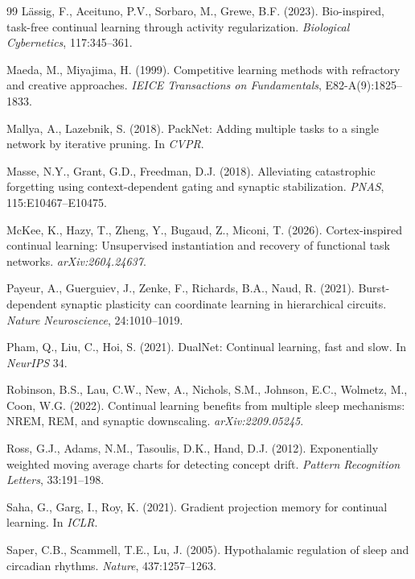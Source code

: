 \documentclass{article}
\begin{document}
\begin{thebibliography}{99}
 L\"assig, F., Aceituno, P.V., Sorbaro, M., Grewe, B.F. (2023). Bio-inspired, task-free continual learning through activity regularization. \emph{Biological Cybernetics}, 117:345--361.

 Maeda, M., Miyajima, H. (1999). Competitive learning methods with refractory and creative approaches. \emph{IEICE Transactions on Fundamentals}, E82-A(9):1825--1833.

 Mallya, A., Lazebnik, S. (2018). PackNet: Adding multiple tasks to a single network by iterative pruning. In \emph{CVPR}.

 Masse, N.Y., Grant, G.D., Freedman, D.J. (2018). Alleviating catastrophic forgetting using context-dependent gating and synaptic stabilization. \emph{PNAS}, 115:E10467--E10475.

 McKee, K., Hazy, T., Zheng, Y., Bugaud, Z., Miconi, T. (2026). Cortex-inspired continual learning: Unsupervised instantiation and recovery of functional task networks. \emph{arXiv:2604.24637}.

 Payeur, A., Guerguiev, J., Zenke, F., Richards, B.A., Naud, R. (2021). Burst-dependent synaptic plasticity can coordinate learning in hierarchical circuits. \emph{Nature Neuroscience}, 24:1010--1019.

 Pham, Q., Liu, C., Hoi, S. (2021). DualNet: Continual learning, fast and slow. In \emph{NeurIPS} 34.

 Robinson, B.S., Lau, C.W., New, A., Nichols, S.M., Johnson, E.C., Wolmetz, M., Coon, W.G. (2022). Continual learning benefits from multiple sleep mechanisms: NREM, REM, and synaptic downscaling. \emph{arXiv:2209.05245}.

 Ross, G.J., Adams, N.M., Tasoulis, D.K., Hand, D.J. (2012). Exponentially weighted moving average charts for detecting concept drift. \emph{Pattern Recognition Letters}, 33:191--198.

 Saha, G., Garg, I., Roy, K. (2021). Gradient projection memory for continual learning. In \emph{ICLR}.

 Saper, C.B., Scammell, T.E., Lu, J. (2005). Hypothalamic regulation of sleep and circadian rhythms. \emph{Nature}, 437:1257--1263.


\end{thebibliography}
\end{document}

